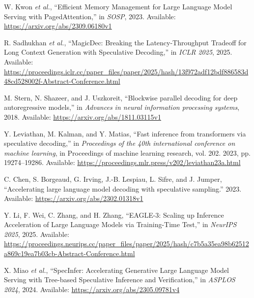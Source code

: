 \documentclass[11pt,a4paper,UTF8,fontset=none,scheme=plain,zihao=-4]{ctexart}
\newenvironment{CSLReferences}[2]{%
  \footnotesize
  \raggedright
  \setlength{\leftskip}{3em}%
  \setlength{\parindent}{-3em}%
  \setlength{\parskip}{0.1\baselineskip}%
  \sloppy
}{}
\newcommand{\CSLLeftMargin}[1]{\makebox[3em][l]{#1}}
\newcommand{\CSLRightInline}[1]{#1}
\begin{document}
\hypertarget{refs}{}
\begin{CSLReferences}{0}{0}
\leavevmode{}%
\CSLLeftMargin{{[}1{]} }
\CSLRightInline{W. Kwon \emph{et al.}, {``{Efficient Memory Management
for Large Language Model Serving with PagedAttention},''} in
\emph{SOSP}, 2023. Available: \url{https://arxiv.org/abs/2309.06180v1}}

\leavevmode{}%
\CSLLeftMargin{{[}2{]} }
\CSLRightInline{R. Sadhukhan \emph{et al.}, {``{MagicDec: Breaking the
Latency-Throughput Tradeoff for Long Context Generation with Speculative
Decoding},''} in \emph{ICLR 2025}, 2025. Available:
\url{https://proceedings.iclr.cc/paper_files/paper/2025/hash/13f972adf12bdf886583d48cd528002f-Abstract-Conference.html}}

\leavevmode{}%
\CSLLeftMargin{{[}3{]} }
\CSLRightInline{M. Stern, N. Shazeer, and J. Uszkoreit, {``Blockwise
parallel decoding for deep autoregressive models,''} in \emph{Advances
in neural information processing systems}, 2018. Available:
\url{https://arxiv.org/abs/1811.03115v1}}

\leavevmode{}%
\CSLLeftMargin{{[}4{]} }
\CSLRightInline{Y. Leviathan, M. Kalman, and Y. Matias, {``Fast
inference from transformers via speculative decoding,''} in
\emph{Proceedings of the 40th international conference on machine
learning}, in Proceedings of machine learning research, vol. 202. 2023,
pp. 19274--19286. Available:
\url{https://proceedings.mlr.press/v202/leviathan23a.html}}

\leavevmode{}%
\CSLLeftMargin{{[}5{]} }
\CSLRightInline{C. Chen, S. Borgeaud, G. Irving, J.-B. Lespiau, L.
Sifre, and J. Jumper, {``Accelerating large language model decoding with
speculative sampling.''} 2023. Available:
\url{https://arxiv.org/abs/2302.01318v1}}

\leavevmode{}%
\CSLLeftMargin{{[}6{]} }
\CSLRightInline{Y. Li, F. Wei, C. Zhang, and H. Zhang, {``{EAGLE-3:
Scaling up Inference Acceleration of Large Language Models via
Training-Time Test},''} in \emph{NeurIPS 2025}, 2025. Available:
\url{https://proceedings.neurips.cc/paper_files/paper/2025/hash/c7b5a35ea98b62512a869c19ea7b03cb-Abstract-Conference.html}}

\leavevmode{}%
\CSLLeftMargin{{[}7{]} }
\CSLRightInline{X. Miao \emph{et al.}, {``{SpecInfer: Accelerating
Generative Large Language Model Serving with Tree-based Speculative
Inference and Verification},''} in \emph{ASPLOS 2024}, 2024. Available:
\url{https://arxiv.org/abs/2305.09781v4}}


\end{CSLReferences}
\end{document}
